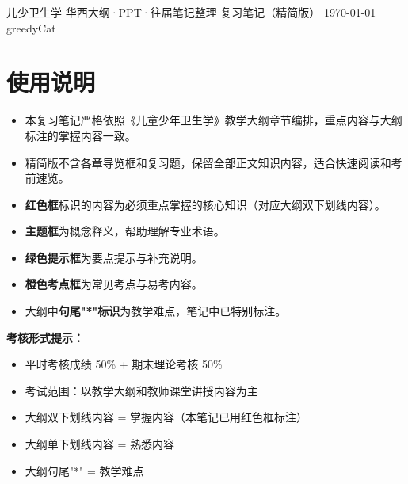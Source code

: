 \documentclass[10pt,a4paper,oneside]{ctexbook}
\begin{document}
\makecover
  {儿少卫生学}
  {华西大纲·PPT·往届笔记整理}
  {复习笔记（精简版）}
  {\today}
  {greedyCat}

\tableofcontents

\chapter*{使用说明}

\begin{itemize}[leftmargin=*]
    \item 本复习笔记严格依照《儿童少年卫生学》教学大纲章节编排，重点内容与大纲标注的掌握内容一致。
    \item 精简版不含各章导览框和复习题，保留全部正文知识内容，适合快速阅读和考前速览。
    \item \textbf{\color{keyred}红色框}标识的内容为必须重点掌握的核心知识（对应大纲双下划线内容）。
    \item \textbf{\color{main}主题框}为概念释义，帮助理解专业术语。
    \item \textbf{\color{darkgreen}绿色提示框}为要点提示与补充说明。
    \item \textbf{\color{orange}橙色考点框}为常见考点与易考内容。
    \item 大纲中\textbf{句尾"*"标识}为教学难点，笔记中已特别标注。
\end{itemize}

\vspace{1cm}
\begin{center}
\begin{tcolorbox}[colback=yellow!10, colframe=yellow!80!black, boxrule=0.8pt, arc=6pt, width=0.85\textwidth, breakable]
\textbf{考核形式提示：}
\begin{itemize}[leftmargin=*]
    \item 平时考核成绩 50\% + 期末理论考核 50\%
    \item 考试范围：以教学大纲和教师课堂讲授内容为主
    \item 大纲双下划线内容 = 掌握内容（本笔记已用红色框标注）
    \item 大纲单下划线内容 = 熟悉内容
    \item 大纲句尾"*" = 教学难点
\end{itemize}
\end{tcolorbox}
\end{center}

\newpage













\end{document}
